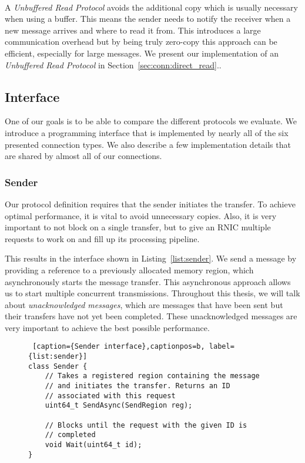 \paragraph{} A \emph{Unbuffered Read Protocol} avoids the additional copy which is usually necessary when using a buffer. This means the 
sender needs to notify the receiver when a new message arrives and where to read it from.  This introduces a large
communication overhead but by being truly zero-copy this approach can be efficient, especially for large messages.
We present our implementation of an \emph{Unbuffered Read Protocol} in Section~\ref{sec:conn:direct_read}..


\pagebreak
\subsection{Interface}

One of our goals is to be able to compare the different protocols we evaluate. We introduce a programming 
interface that is implemented by nearly all of the six presented connection types. We also describe a few implementation 
details that are shared by almost all of our connections.

\subsubsection{Sender}

Our protocol definition requires that the sender initiates the transfer. To achieve optimal performance, it is
vital to avoid unnecessary copies. Also, it is very important to not block on a single transfer, but to give an RNIC multiple
requests to work on and fill up its processing pipeline. 

This results in the interface shown in Listing~\ref{list:sender}. We send a message by providing a reference
to a previously allocated memory region, which asynchronously starts the message transfer. This asynchronous approach allows
us to start multiple concurrent transmissions. Throughout this thesis, we will talk about \emph{unacknowledged messages}, which
are messages that have been sent but their transfers have not yet been completed. These unacknowledged messages are very 
important to achieve the best possible performance.

\begin{figure}[htp]
\begin{lstlisting} [caption={Sender interface},captionpos=b, label={list:sender}] 
class Sender {
    // Takes a registered region containing the message
    // and initiates the transfer. Returns an ID 
    // associated with this request
    uint64_t SendAsync(SendRegion reg);

    // Blocks until the request with the given ID is
    // completed
    void Wait(uint64_t id);
}
\end{lstlisting}
\end{figure}

